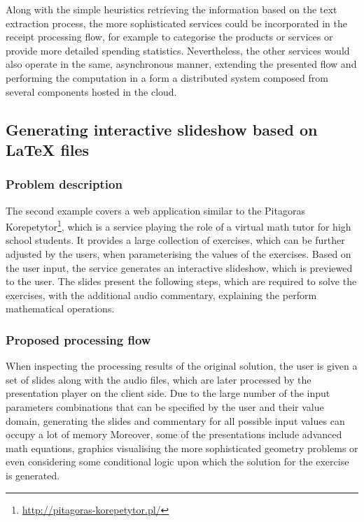 Along with the simple heuristics retrieving the information based on the text extraction process, the more sophisticated services could be incorporated in the receipt processing flow, for example to categorise the products or services or provide more detailed spending statistics. Nevertheless, the other services would also operate in the same, asynchronous manner, extending the presented flow and performing the computation in a form a distributed system composed from several components hosted in the cloud.

\subsection{Generating interactive slideshow based on LaTeX files} \label{chapter:examples-generating-interactive-slideshow-based-on-latex-files}

\subsubsection{Problem description}

The second example covers a web application similar to the Pitagoras Korepetytor\footnote{\url{http://pitagoras-korepetytor.pl/}}, which is a service playing the role of a virtual math tutor for high school students.
It provides a large collection of exercises, which can be further adjusted by the users, when parameterising the values of the exercises.
Based on the user input, the service generates an interactive slideshow, which is previewed to the user.
The slides present the following steps, which are required to solve the exercises, with the additional audio commentary, explaining the perform mathematical operations.

\subsubsection{Proposed processing flow} \label{chapter:examples-generating-interactive-slideshow-based-on-latex-files-proposed-processing-flow}

When inspecting the processing results of the original solution, the user is given a set of slides along with the audio files, which are later processed by the presentation player on the client side.
Due to the large number of the input parameters combinations that can be specified by the user and their value domain, generating the slides and commentary for all possible input values can occupy a lot of memory
Moreover, some of the presentations include advanced math equations, graphics visualising the more sophisticated geometry problems or even considering some conditional logic upon which the solution for the exercise is generated.

